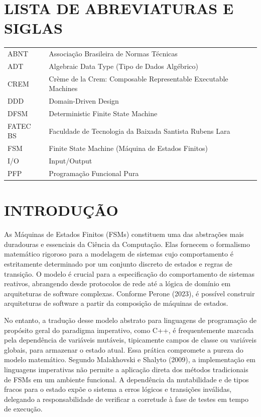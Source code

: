 \documentclass[12pt,a4paper]{article}
\begin{document}
\newpage
\section*{LISTA DE ABREVIATURAS E SIGLAS}

\begin{tabular}{ll}
ABNT & Associação Brasileira de Normas Técnicas\\
ADT & Algebraic Data Type (Tipo de Dados Algébrico)\\
CREM & Crème de la Crem: Composable Representable Executable Machines\\
DDD & Domain-Driven Design\\
DFSM & Deterministic Finite State Machine\\
FATEC BS & Faculdade de Tecnologia da Baixada Santista Rubens Lara\\
FSM & Finite State Machine (Máquina de Estados Finitos)\\
I/O & Input/Output\\
PFP & Programação Funcional Pura\\
\end{tabular}

\newpage
\tableofcontents

\newpage
\section{INTRODUÇÃO}

As Máquinas de Estados Finitos (FSMs) constituem uma das abstrações mais duradouras e essenciais da Ciência da Computação. Elas fornecem o formalismo matemático rigoroso para a modelagem de sistemas cujo comportamento é estritamente determinado por um conjunto discreto de estados e regras de transição. O modelo é crucial para a especificação do comportamento de sistemas reativos, abrangendo desde protocolos de rede até a lógica de domínio em arquiteturas de software complexas. Conforme Perone (2023), é possível construir arquiteturas de software a partir da composição de máquinas de estados.

No entanto, a tradução desse modelo abstrato para linguagens de programação de propósito geral do paradigma imperativo, como C++, é frequentemente marcada pela dependência de variáveis mutáveis, tipicamente campos de classe ou variáveis globais, para armazenar o estado atual. Essa prática compromete a pureza do modelo matemático. Segundo Malakhovski e Shalyto (2009), a implementação em linguagens imperativas não permite a aplicação direta dos métodos tradicionais de FSMs em um ambiente funcional. A dependência da mutabilidade e de tipos fracos para o estado expõe o sistema a erros lógicos e transições inválidas, delegando a responsabilidade de verificar a corretude à fase de testes em tempo de execução.
\end{document}

